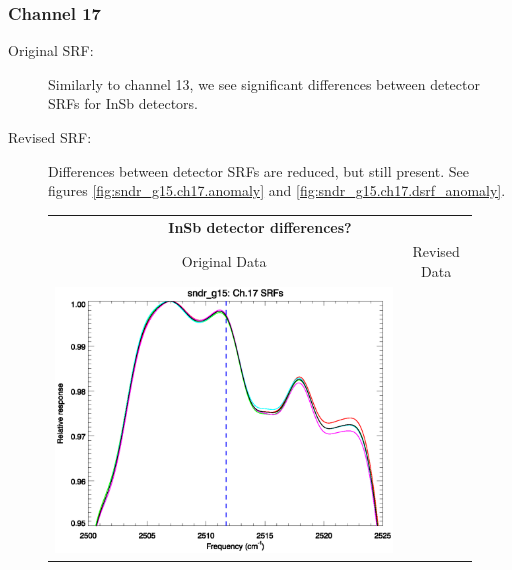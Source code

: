 \subsubsection{Channel 17}
\begin{description}
  \item[Original SRF:] Similarly to channel 13, we see significant differences between detector SRFs for InSb detectors.
  \item[Revised SRF:]  Differences between detector SRFs are reduced, but still present. See figures \ref{fig:sndr_g15.ch17.anomaly} and \ref{fig:sndr_g15.ch17.dsrf_anomaly}.
\end{description}

\begin{figure}[htp]
  \centering
  \begin{tabular}{c c}
    \multicolumn{2}{c}{\textsf{\bfseries InSb detector differences?}} \\
    \hspace{1.5em}\textsf{Original Data} &
    \hspace{1.5em}\textsf{Revised Data} \\
    \includegraphics[scale=0.5,trim=0 40 0 0]{graphics/zoom_anomaly/original/sndr_g15.ch17.srf.eps} &

\end{tabular}
\end{figure}
